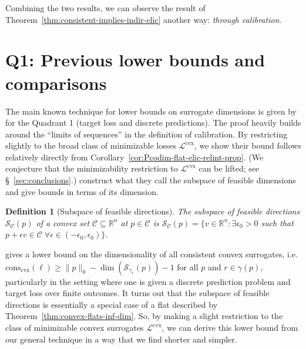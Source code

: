 \documentclass[11pt]{article} %
\newcommand{\Comments}{1}
\newcommand{\mynote}[2]{\ifnum\Comments=1\textcolor{#1}{#2}\fi}
\newcommand{\mytodo}[2]{\ifnum\Comments=1%
	\todo[linecolor=#1!80!black,backgroundcolor=#1,bordercolor=#1!80!black]{#2}\fi}
\newcommand{\jessiet}[1]{\mytodo{teal!20!white}{JF: #1}}
\newcommand{\bo}[1]{\mynote{blue}{[Bo: #1]}}
\newcommand{\reals}{\mathbb{R}}
\newcommand{\conscvx}{\mathrm{cons}_\mathrm{cvx}}
\newcommand{\C}{\mathcal{C}}
\newcommand{\Lcvx}{\mathcal{L}^{\mathrm{cvx}}}
\newcommand{\Sc}{\mathcal{S}}  %
\newtheorem{definition}{Definition}
\begin{document}
Combining the two results, we can observe the result of Theorem~\ref{thm:consistent-implies-indir-elic} another way: \emph{through calibration}.

\section{Q1: Previous lower bounds and comparisons}\label{sec:finite-calib}

The main known technique for lower bounds on surrogate dimensions is given by \citet{ramaswamy2016convex} for the Quadrant 1 (target loss and discrete predictions).
The proof heavily builds around the ``limits of sequences'' in the definition of calibration.
By restricting slightly to the broad class of minimizable losses $\Lcvx$, we show their bound follows relatively directly from Corollary~\ref{cor:Pcodim-flat-elic-relint-prop}.
(We conjecture that the minimizability restriction to $\Lcvx$ can be lifted; see \S~\ref{sec:conclusions}.)
\citet{ramaswamy2016convex} construct what they call the subspace of feasible dimensions and give bounds in terms of its dimension.
\begin{definition}[Subspace of feasible directions]\label{def:subspace-feas}
	The \emph{subspace of feasible directions} $\Sc_\C(p)$ of a convex set $\C \subseteq \reals^n$ at $p \in \C$ is $\Sc_\C(p) = \{ v \in \reals^n : \exists \epsilon_0 > 0 $ such that $p + \epsilon v \in \C \; \forall \epsilon \in (-\epsilon_0,\epsilon_0) \}$.
\end{definition}

\citet{ramaswamy2016convex} gives a lower bound on the dimensionality of all consistent convex surrogates, i.e. $\conscvx(\ell) \geq \|p\|_0 - \dim(\Sc_{\gamma_r}(p)) - 1$ for all $p$ and $r \in \gamma(p)$, particularly in the setting where one is given a discrete prediction problem and target loss over finite outcomes.
It turns out that the subspace of feasible directions is essentially a special case of a flat described by Theorem~\ref{thm:convex-flats-inf-dim}.
So, by making a slight restriction to the class of minimizable convex surrogates $\Lcvx$, we can derive this lower bound from our general technique in a way that we find shorter and simpler.
\end{document}

